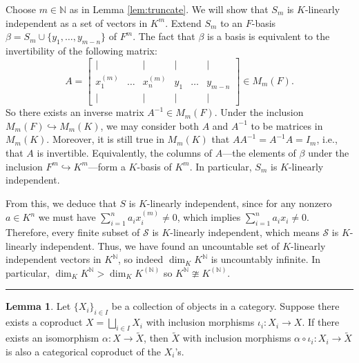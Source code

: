 \documentclass[12pt]{article}
\theoremstyle{definition}
\newtheorem{lemma}{Lemma}
\newcommand{\N}{\mathbb{N}}
\newcommand{\<}{\langle}
\renewcommand{\>}{\rangle}
\renewcommand{\tilde}{\widetilde}
\newcommand{\inc}{\hookrightarrow}
\newcommand{\mat}[1]{\begin{bmatrix}#1\end{bmatrix}}
\renewcommand{\_}[1]{{_{#1}}}
\begin{document}
Choose $m \in \N$ as in Lemma \ref{lem:truncate}.
We will show that $S_m$ is $K$-linearly independent as a set of vectors in $K^m$.
Extend $S_m$ to an $F$-basis $\beta = S_m \cup \{y_1, \dots, y_{m - n}\}$ of $F^m$.
The fact that $\beta$ is a basis is equivalent to the invertibility of the following matrix:
\[
    A = \mat{
        | & & | & | & & | \\
        x_1^{(m)} & \dots & x_n^{(m)} & y_1 & \dots & y_{m - n} \\
        | & & | & | & & |
    } \in M_m(F).
\]
So there exists an inverse matrix $A^{-1} \in M_m(F)$.
Under the inclusion $M_m(F) \inc M_m(K)$, we may consider both $A$ and $A^{-1}$ to be matrices in $M_m(K)$.
Moreover, it is still true in $M_m(K)$ that $AA^{-1} = A^{-1}A = I_m$, i.e., that $A$ is invertible.
Equivalently, the columns of $A$---the elements of $\beta$ under the inclusion $F^m \inc K^m$---form a $K$-basis of $K^m$.
In particular, $S_m$ is $K$-linearly independent.

From this, we deduce that $S$ is $K$-linearly independent, since for any nonzero $a \in K^n$ we must have $\sum_{i=1}^{n} a_i x_i^{(m)} \ne 0$, which implies $\sum_{i=1}^{n} a_i x_i \ne 0$.
Therefore, every finite subset of $\mathcal{S}$ is $K$-linearly independent, which means $\mathcal{S}$ is $K$-linearly independent.
Thus, we have found an uncountable set of $K$-linearly independent vectors in $K^\N$, so indeed $\dim_K K^\N$ is uncountably infinite.
In particular, $\dim_K K^\N > \dim_K K^{(\N)}$ so $K^\N \ncong K^{(\N)}$.



\rule{\textwidth}{0.4pt}


\begin{lemma}\label{lem:coprod_iso}
    Let $\{X_i\}_{i \in I}$ be a collection of objects in a category.
    Suppose there exists a coproduct $X = \bigsqcup_{i \in I} X_i$ with inclusion morphisms $\iota_i : X_i \to X$.
    If there exists an isomorphism $\alpha : X \to \tilde{X}$, then $\tilde{X}$ with inclusion morphisms $\alpha \circ \iota_i : X_i \to \tilde{X}$ is also a categorical coproduct of the $X_i$'s.
\end{lemma}
\end{document}
